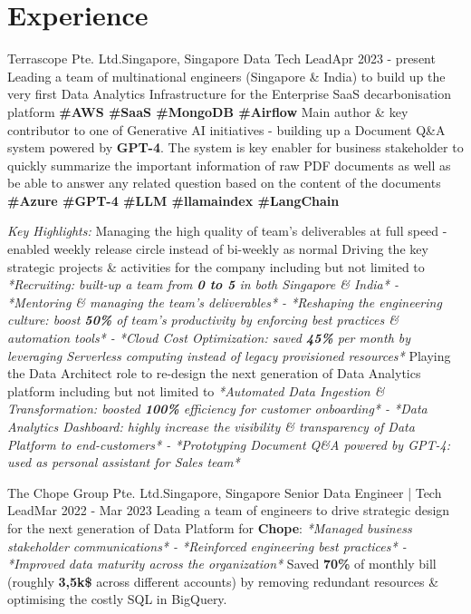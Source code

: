\section{Experience}
  \resumeSubHeadingListStart
    
    \resumeSubheading
      {Terrascope Pte. Ltd.}{Singapore, Singapore}
      {Data Tech Lead}{Apr 2023 - present}
      \resumeItemListStart
          {Leading a team of multinational engineers (Singapore \& India) to build up the very first Data Analytics Infrastructure for the Enterprise SaaS decarbonisation platform \textbf{\scriptsize{\#AWS \#SaaS \#MongoDB \#Airflow}}}
          {Main author \& key contributor to one of Generative AI initiatives - building up a Document Q\&A system powered by \textbf{GPT-4}. The system is key enabler for business stakeholder to quickly summarize the important information of raw PDF documents as well as be able to answer any related question based on the content of the documents \textbf{\scriptsize{\#Azure \#GPT-4 \#LLM \#llamaindex \#LangChain}}}
      \resumeItemListEnd
      
      \emph{Key Highlights:}
      \resumeItemListStart
          {Managing the high quality of team's deliverables at full speed - enabled weekly release circle instead of bi-weekly as normal}
          {Driving the key strategic projects \& activities for the company including but not limited to \emph{*Recruiting: built-up a team from \textbf{0 to 5} in both Singapore \& India* - *Mentoring \& managing the team's deliverables* - *Reshaping the engineering culture: boost \textbf{50\%} of team's productivity by enforcing best practices \& automation tools* - *Cloud Cost Optimization: saved \textbf{45\%} per month by leveraging Serverless computing instead of legacy provisioned resources*}}
          {Playing the Data Architect role to re-design the next generation of Data Analytics platform including but not limited to \emph{*Automated Data Ingestion \& Transformation: boosted \textbf{100\%} efficiency for customer onboarding* - *Data Analytics Dashboard: highly increase the visibility \& transparency of Data Platform to end-customers* - *Prototyping Document Q\&A powered by GPT-4: used as personal assistant for Sales team*}}
      \resumeItemListEnd

    \resumeSubheading
      {The Chope Group Pte. Ltd.}{Singapore, Singapore}
      {Senior Data Engineer | Tech Lead}{Mar 2022 - Mar 2023}
      \resumeItemListStart
          {Leading a team of engineers to drive strategic design for the next generation of Data Platform  for \textbf{Chope}: \emph{*Managed business stakeholder communications* - *Reinforced engineering best practices* - *Improved data maturity across the organization*}}
          {Saved \textbf{70\%} of monthly bill (roughly \textbf{3,5k\$} across different accounts) by removing redundant resources \& optimising the costly SQL in BigQuery.}
      \resumeItemListEnd

